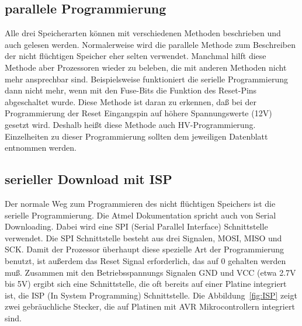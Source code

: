 \subsection{parallele Programmierung}
Alle drei Speicherarten können mit verschiedenen Methoden beschrieben und auch gelesen werden.
Normalerweise wird die parallele Methode zum Beschreiben der nicht flüchtigen Speicher eher
selten verwendet. Manchmal hilft diese Methode aber Prozessoren wieder zu beleben,
die mit anderen Methoden nicht mehr ansprechbar sind.
Beispielsweise funktioniert die serielle Programmierung dann nicht mehr, wenn mit den Fuse-Bits
die Funktion des Reset-Pins abgeschaltet wurde.
Diese Methode ist daran zu erkennen,
daß bei der Programmierung der Reset Eingangspin auf höhere Spannungswerte (12V) gesetzt wird.
Deshalb heißt diese Methode auch HV-Programmierung.
Einzelheiten zu dieser Programmierung sollten dem jeweiligen Datenblatt entnommen werden.

\subsection{serieller Download mit ISP}

Der normale Weg zum Programmieren des nicht flüchtigen Speichers ist die serielle Programmierung.
Die Atmel Dokumentation spricht auch von Serial Downloading. Dabei wird eine SPI (Serial Parallel Interface)
Schnittstelle verwendet.
Die SPI Schnittstelle besteht aus drei Signalen, MOSI, MISO und SCK.
Damit der Prozessor überhaupt diese spezielle Art der Programmierung benutzt, ist außerdem
das Reset Signal erforderlich, das auf 0 gehalten werden muß.
Zusammen mit den Betriebsspannungs Signalen GND und VCC (etwa 2.7V bis 5V) ergibt sich eine
Schnittstelle, die oft bereits auf einer Platine integriert ist, die ISP (In System Programming) 
Schnittstelle. Die Abbildung~\ref{fig:ISP} zeigt zwei gebräuchliche Stecker, die auf
Platinen mit AVR Mikrocontrollern integriert sind.

